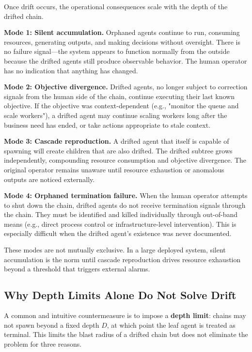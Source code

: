 Once drift occurs, the operational consequences scale with the depth of the drifted chain.

\textbf{Mode 1: Silent accumulation.} Orphaned agents continue to run, consuming resources, generating outputs, and making decisions without oversight. There is no failure signal—the system appears to function normally from the outside because the drifted agents still produce observable behavior. The human operator has no indication that anything has changed.

\textbf{Mode 2: Objective divergence.} Drifted agents, no longer subject to correction signals from the human side of the chain, continue executing their last known objective. If the objective was context-dependent (e.g., "monitor the queue and scale workers"), a drifted agent may continue scaling workers long after the business need has ended, or take actions appropriate to stale context.

\textbf{Mode 3: Cascade reproduction.} A drifted agent that itself is capable of spawning will create children that are also drifted. The drifted subtree grows independently, compounding resource consumption and objective divergence. The original operator remains unaware until resource exhaustion or anomalous outputs are noticed externally.

\textbf{Mode 4: Orphaned termination failure.} When the human operator attempts to shut down the chain, drifted agents do not receive termination signals through the chain. They must be identified and killed individually through out-of-band means (e.g., direct process control or infrastructure-level intervention). This is especially difficult when the drifted agent's existence was never documented.

These modes are not mutually exclusive. In a large deployed system, silent accumulation is the norm until cascade reproduction drives resource exhaustion beyond a threshold that triggers external alarms.

\subsection{Why Depth Limits Alone Do Not Solve Drift}

A common and intuitive countermeasure is to impose a \textbf{depth limit}: chains may not spawn beyond a fixed depth $D$, at which point the leaf agent is treated as terminal. This limits the blast radius of a drifted chain but does not eliminate the problem for three reasons.

